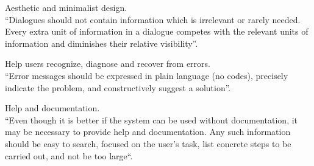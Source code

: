 \documentclass[11pt, letterpaper]{article}
\begin{document}
\begin{NH}
    \item Aesthetic and minimalist design. \\
            “Dialogues should not contain information which is irrelevant or rarely needed. Every extra unit of information in a dialogue competes with the relevant units of information and diminishes their relative visibility”. 
    \item Help users recognize, diagnose and recover from errors.  \\
            “Error messages should be expressed in plain language (no codes), precisely indicate the problem, and constructively suggest a solution”.
    \item Help and documentation. \\
            “Even though it is better if the system can be used without documentation, it may be necessary to provide help and documentation. Any such information should be easy to search, focused on the user's task, list concrete steps to be carried out, and not be too large“.
\end{NH}
\end{document}
